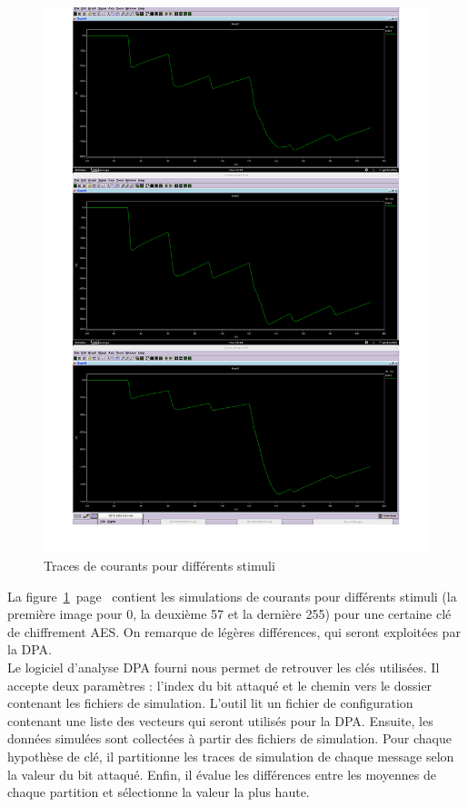 \begin{figure}[h!]
    \centering
    \includegraphics[width=\textwidth]{data/courantsImage}
    \caption{Traces de courants pour différents stimuli}
    \label{fig:courants}
\end{figure}

La figure~\ref{fig:courants}~page~\pageref{fig:courants}
 contient les simulations de courants pour différents stimuli
(la première image pour 0, la deuxième 57 et la dernière 255) pour une certaine
clé de chiffrement AES. On remarque de légères différences, qui seront
exploitées par la DPA.\\

Le logiciel d'analyse DPA fourni nous permet de retrouver les clés utilisées.
Il accepte deux paramètres : l'index du bit attaqué et le chemin vers le
dossier contenant les fichiers de simulation.
L'outil lit un fichier de configuration contenant une liste des vecteurs qui
seront utilisés pour la DPA. Ensuite, les données simulées sont collectées à
partir des fichiers de simulation. Pour chaque hypothèse de clé, il partitionne
les traces de simulation de chaque message selon la valeur du bit attaqué.
Enfin, il évalue les différences entre les moyennes de chaque partition et
sélectionne la valeur la plus haute.


